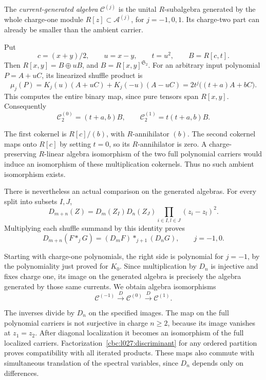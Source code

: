 The \emph{current-generated algebra} $\mathcal C^{(j)}$ is the
unital $R$-subalgebra generated by the whole charge-one module
$R[z]\subset\mathcal A^{(j)}$, for $j=-1,0,1$.
Its charge-two part can already be smaller than the ambient carrier.

Put
\[
 c=(x+y)/2,\qquad u=x-y,\qquad t=u^2,\qquad B=R[c,t].
\]
Then $R[x,y]=B\oplus uB$, and $B=R[x,y]^{\mathfrak S_2}$.
For an arbitrary input polynomial $P=A+uC$, its linearized shuffle
product is
\begin{equation}\label{cbc:l027:binary-row}
 \mu_j(P)=K_j(u)(A+uC)+K_j(-u)(A-uC)
 =2t^j\bigl((t+a)A+bC\bigr).
\end{equation}
This computes the entire binary map, since pure tensors span
$R[x,y]$.  Consequently
\[
 \mathcal C^{(0)}_2=(t+a,b)B,
 \qquad \mathcal C^{(1)}_2=t(t+a,b)B.
\]

The first cokernel is $R[c]/(b)$, with $R$-annihilator $(b)$.
The second cokernel maps onto $R[c]$ by setting $t=0$, so its
$R$-annihilator is zero.  A charge-preserving $R$-linear algebra
isomorphism of the two full polynomial carriers would induce an
isomorphism of these multiplication cokernels.  Thus no such
ambient isomorphism exists.

There is nevertheless an actual comparison on the generated
algebras.  For every split into subsets $I,J$,
\begin{equation}\label{cbc:l027:discriminant}
 D_{m+n}(Z)=D_m(Z_I)D_n(Z_J)
 \prod_{i\in I,l\in J}(z_i-z_l)^2.
\end{equation}
Multiplying each shuffle summand by this identity proves
\[
 D_{m+n}(F*_jG)=(D_mF)*_{j+1}(D_nG),\qquad j=-1,0.
\]

Starting with charge-one polynomials, the right side is polynomial
for $j=-1$, by the polynomiality just proved for $K_0$.
Since multiplication by $D_n$ is injective and fixes charge one,
its image on the generated algebra is precisely the algebra
generated by those same currents.  We obtain algebra isomorphisms
\begin{equation}\label{cbc:l027:generated-comparison}
 \mathcal C^{(-1)}\xrightarrow{\;D\;}
 \mathcal C^{(0)}\xrightarrow{\;D\;}
 \mathcal C^{(1)}.
\end{equation}

The inverses divide by $D_n$ on the specified images.
The map on the full polynomial carriers is not surjective in charge
$n\geq2$, because its image vanishes at $z_1=z_2$.
After diagonal localization it becomes an isomorphism of the full
localized carriers.  Factorization~\eqref{cbc:l027:discriminant}
for any ordered partition proves compatibility with all iterated
products.  These maps also commute with simultaneous translation
of the spectral variables, since $D_n$ depends only on differences.

